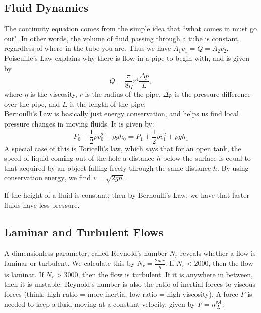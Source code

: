 \documentclass[class=article, crop=false]{standalone}
\begin{document}
  \subsection{Fluid Dynamics}
  The continuity equation comes from the simple idea that ``what comes in must go out". In other words, the volume of fluid passing through a tube is constant, regardless of where in the tube you are. Thus we have $A_1v_1 = Q = A_2v_2$. \\[10pt]
  Poiseuille's Law explains why there is flow in a pipe to begin with, and is given by 
  \[
    Q = \frac{\pi}{8\eta}r^4\frac{\Delta p}{L},
  \]
  where $\eta$ is the viscosity, $r$ is the radius of the pipe, $\Delta p$ is the pressure difference over the pipe, and $L$ is the length of the pipe. \\[10pt]
  Bernoulli's Law is basically just energy conservation, and helps us find local pressure changes in moving fluids. It is given by:
  \[
    P_0+\frac{1}{2}\rho v_0^2 + \rho gh_0 =P_1 + \frac{1}{2}\rho v_1^2 + \rho gh_1
  \]
  A special case of this is Toricelli's law, which says that for an open tank, the speed of liquid coming out of the hole a distance $h$ below the surface is equal to that acquired by an object falling freely through the same distance $h$. By using conservation energy, we find $v=\sqrt{2gh}$.
  \begin{note}{}
    If the height of a fluid is constant, then by Bernoulli's Law, we have that faster fluids have less pressure.
  \end{note}
  \subsection{Laminar and Turbulent Flows}
  A dimensionless parameter, called Reynold's number $N_r$ reveals whether a flow is laminar or turbulent. We calculate this by $N_r = \frac{2\rho vr}{\eta}$. If $N_r < 2000$, then the flow is laminar. If $N_r > 3000$, then the flow is turbulent. If it is anywhere in between, then it is unstable. Reynold's number is also the ratio of inertial forces to viscous forces (think: high ratio = more inertia, low ratio = high viscosity). A force $F$ is needed to keep a fluid moving at a constant velocity, given by $F = \eta \frac{vA}{L}$. 
\end{document}

